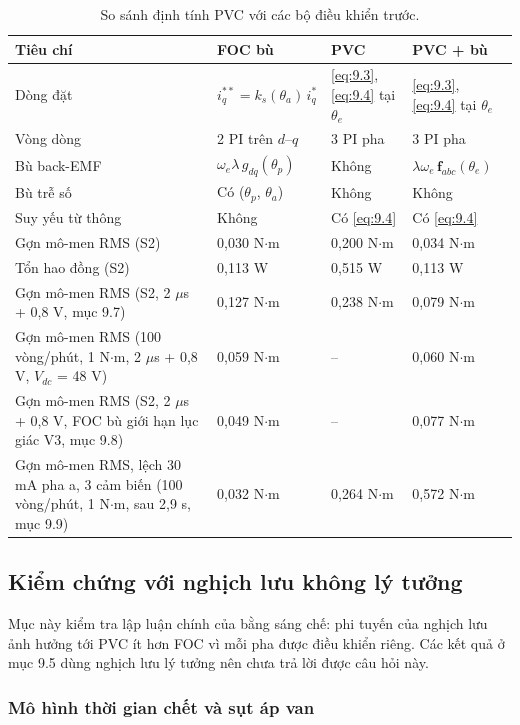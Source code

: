 \begin{table}[H]
\centering\small
\caption{So sánh định tính PVC với các bộ điều khiển trước.}\label{tab:9.4}
\begin{tabularx}{\linewidth}{@{}>{\raggedright\arraybackslash}Xlll@{}}
\toprule
Tiêu chí & FOC bù & PVC & PVC + bù \\ \midrule
Dòng đặt & $i_q^{**} = k_s(\theta_a)\, i_q^*$ & \eqref{eq:9.3}, \eqref{eq:9.4} tại $\theta_e$ & \eqref{eq:9.3}, \eqref{eq:9.4} tại $\theta_e$ \\
Vòng dòng & 2 PI trên $d$–$q$ & 3 PI pha & 3 PI pha \\
Bù back-EMF & $\omega_e\lambda\, g_{dq}(\theta_p)$ & Không & $\lambda\omega_e\,\mathbf{f}_{abc}(\theta_e)$ \\
Bù trễ số & Có ($\theta_p$, $\theta_a$) & Không & Không \\
Suy yếu từ thông & Không & Có \eqref{eq:9.4} & Có \eqref{eq:9.4} \\
Gợn mô-men RMS (S2) & 0,030 N$\cdot$m & 0,200 N$\cdot$m & 0,034 N$\cdot$m \\
Tổn hao đồng (S2) & 0,113 W & 0,515 W & 0,113 W \\
Gợn mô-men RMS (S2, 2 $\mu$s + 0,8 V, mục 9.7) & 0,127 N$\cdot$m & 0,238 N$\cdot$m & 0,079 N$\cdot$m \\
Gợn mô-men RMS (100 vòng/phút, 1 N$\cdot$m, 2 $\mu$s + 0,8 V, $V_{dc}$ = 48 V) & 0,059 N$\cdot$m & – & 0,060 N$\cdot$m \\
Gợn mô-men RMS (S2, 2 $\mu$s + 0,8 V, FOC bù giới hạn lục giác V3, mục 9.8) & 0,049 N$\cdot$m & – & 0,077 N$\cdot$m \\
Gợn mô-men RMS, lệch 30 mA pha a, 3 cảm biến (100 vòng/phút, 1 N$\cdot$m, sau 2,9 s, mục 9.9) & 0,032 N$\cdot$m & 0,264 N$\cdot$m & 0,572 N$\cdot$m \\
\bottomrule
\end{tabularx}
\end{table}

\subsection{Kiểm chứng với nghịch lưu không lý tưởng}\label{sec:9.7}

Mục này kiểm tra lập luận chính của bằng sáng chế: phi tuyến của nghịch lưu ảnh hưởng tới PVC ít hơn FOC vì mỗi pha được điều khiển riêng. Các kết quả ở mục 9.5 dùng nghịch lưu lý tưởng nên chưa trả lời được câu hỏi này.

\subsubsection{Mô hình thời gian chết và sụt áp van}\label{sec:9.7.1}


